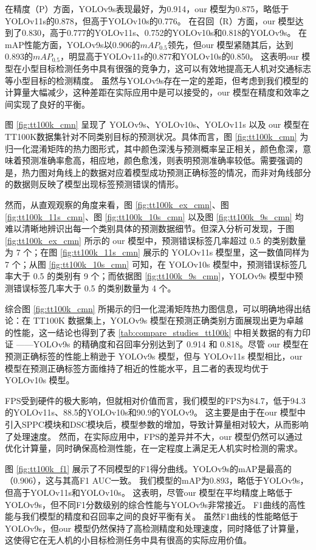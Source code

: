 在精度（P）方面，YOLOv9s表现最好，为0.914，our 模型为0.875，略低于YOLOv11s的0.878，但高于YOLOv10s的0.776。
在召回（R）方面，our 模型达到了0.830，高于0.777的YOLOv11s、0.752的YOLOv10s和0.818的YOLOv9s。
在mAP性能方面，YOLOv9s以0.906的$mAP_{0.5}$领先，但our 模型紧随其后，达到0.893的$mAP_{0.5}$，明显高于YOLOv11s的0.877和YOLOv10s的0.850。
这表明our 模型在小型目标检测任务中具有很强的竞争力，这可以有效地提高无人机对交通标志等小型目标的检测精度。
虽然与YOLOv9s存在一定的差距，但考虑到我们模型的计算量大幅减少，这种差距在实际应用中是可以接受的，our 模型在精度和效率之间实现了良好的平衡。

图 \ref{fig:tt100k_cmn} 呈现了 YOLOv9s、YOLOv10s、YOLOv11s 以及 our 模型在TT100K数据集针对不同类别目标的预测状况。具体而言，图 \ref{fig:tt100k_cmn} 为归一化混淆矩阵的热力图形式，其中颜色深浅与预测概率呈正相关，颜色愈深，意味着预测准确率愈高，相应地，颜色愈浅，则表明预测准确率较低。需要强调的是，热力图对角线上的数据对应着模型成功预测正确标签的情况，而非对角线部分的数据则反映了模型出现标签预测错误的情形。

然而，从直观观察的角度来看，图 \ref{fig:tt100k_ex_cmn}、图 \ref{fig:tt100k_11s_cmn}、图 \ref{fig:tt100k_10s_cmn} 以及图 \ref{fig:tt100k_9s_cmn} 均难以清晰地辨识出每一个类别具体的预测数据细节。但深入分析可发现，于图 \ref{fig:tt100k_ex_cmn} 所示的 our 模型中，预测错误标签几率超过 0.5 的类别数量为 7 个；在图 \ref{fig:tt100k_11s_cmn} 展示的 YOLOv11s 模型里，这一数值同样为 7 个；从图 \ref{fig:tt100k_10s_cmn} 可知，在 YOLOv10s 模型中，预测错误标签几率大于 0.5 的类别有 9 个；而依据图 \ref{fig:tt100k_9s_cmn}，YOLOv9s 模型中预测错误标签几率大于 0.5 的类别数量为 4 个。

综合图 \ref{fig:tt100k_cmn} 所揭示的归一化混淆矩阵热力图信息，可以明确地得出结论：在 TT100K 数据集上，YOLOv9s 模型在预测正确类别方面展现出更为卓越的性能，这一结论也得到了表 \ref{tab:compare_studies_tt100k} 中相关数据的有力印证 ——YOLOv9s 的精确度和召回率分别达到了 0.914 和 0.818。尽管 our 模型在预测正确标签的性能上稍逊于 YOLOv9s 模型，但与 YOLOv11s 模型相比，our 模型在预测正确标签方面维持了相近的性能水平，且二者的表现均优于 YOLOv10s 模型。

FPS受到硬件的极大影响，但就相对价值而言，我们模型的FPS为84.7，低于94.3的YOLOv11s、88.5的YOLOv10s和90.9的YOLOv9。 这主要是由于在our 模型中引入SPPC模块和DSC模块后，模型参数的增加，导致计算量相对较大，从而影响了处理速度。 然而，在实际应用中，FPS的差异并不大，our 模型仍然可以通过优化计算量，同时确保高检测性能，在一定程度上满足无人机实时检测的需求。

图 \ref{fig:tt100k_f1} 展示了不同模型的F1得分曲线。YOLOv9s的mAP是最高的（0.906），这与其高F1 AUC一致。 我们模型的mAP为0.893，略低于YOLOv9s，但高于YOLOv11s和YOLOv10s。 这表明，尽管our 模型在平均精度上略低于YOLOv9s，但不同F1分数级别的综合性能与YOLOv9s非常接近。 F1曲线的高性能与我们模型的精度和召回率之间的良好平衡有关。 虽然F1曲线的性能略低于YOLOv9s，但our 模型仍然保持了高检测精度和处理速度，同时降低了计算量，这使得它在无人机的小目标检测任务中具有很高的实际应用价值。

